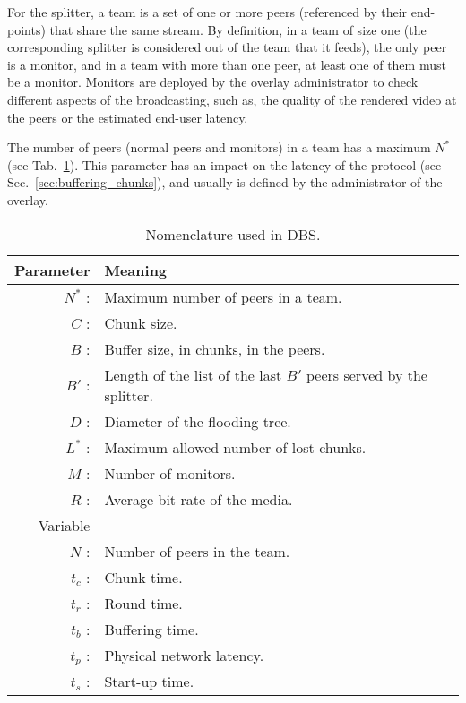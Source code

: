 

\label{sec:team_def}

For the splitter, a team is a set of one or more peers (referenced by
their end-points) that share the same stream. By definition, in a team
of size one (the corresponding splitter is considered out of the team
that it feeds), the only peer is a \gls{monitor}, and in a team with
more than one peer, at least one of them must be a monitor. Monitors
are deployed by the overlay administrator to check different aspects
of the broadcasting, such as, the quality of the rendered video at the
peers or the estimated end-user latency.

The number of peers (normal peers and monitors) in a team has a
maximum $N^*$ (see Tab.~\ref{tab:DBS_nomenclature}). This parameter
has an impact on the latency of the protocol (see
Sec.~\ref{sec:buffering_chunks}), and usually is defined by the
administrator of the overlay.

\begin{table}[t]
  \centering
  \begin{tabular}{rl}
    Parameter & Meaning \\
    \hline
    $N^*$ :  & Maximum number of peers in a team. \\
    $C$ :    & Chunk size. \\
    $B$ :    & Buffer size, in chunks, in the peers. \\
    $B'$ :   & Length of the list of the last $B'$ peers served by the splitter. \\ 
    $D$ :    & Diameter of the flooding tree. \\
    $L^*$ :  & Maximum allowed number of lost chunks. \\
    $M$ :    & Number of monitors. \\
    $R$ :    & Average bit-rate of the media. \\
    Variable & \\
    \hline
    $N$ :    & Number of peers in the team. \\
    $t_c$ :  & Chunk time. \\
    $t_r$ :  & Round time. \\
    $t_b$ :  & Buffering time. \\
    $t_p$ :  & Physical network latency. \\
    $t_s$ :  & Start-up time.
  \end{tabular}
  \caption{Nomenclature used in DBS.} %
  \label{tab:DBS_nomenclature}
\end{table}

